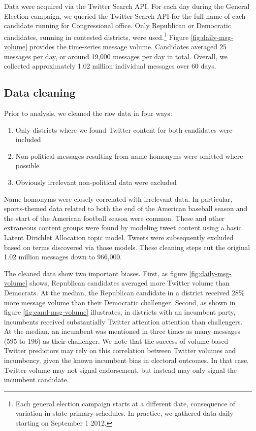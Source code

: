 \documentclass[11pt]{article}
\begin{document}
Data were acquired via the Twitter Search API. For each day during the
General Election campaign, we queried the Twitter Search API for the
full name of each candidate running for Congressional
office. Only Republican or Democratic candidates, running in contested
districts, were used.\footnote{Each general election campaign starts at a different
date, consequence of variation in state primary schedules. In
practice, we gathered data daily starting on September 1 2012.} Figure
\ref{fig:daily-msg-volume} provides the time-series message
volume. Candidates averaged 25 messages per day, or around 19,000
messages per day in total. Overall, we collected approximately 1.02
million individual messages over 60 days. 

\subsection{Data cleaning}
\label{sec:data-cleaning}

Prior to analysis, we cleaned the raw data in four ways:
\begin{enumerate}
\item Only districts where we found Twitter content for both
  candidates were included
\item Non-political messages resulting from name homonyms were omitted where possible
\item Obviously irrelevant non-political data were excluded
\end{enumerate}

Name homonyms were closely correlated with irrelevant data. In
particular, sports-themed data related to both the end of the American
baseball season and the start of the American football season were
common. These and other extraneous content groups were found by
modeling tweet content using a basic Latent Dirichlet Allocation topic
model. Tweets were subsequently excluded based on terms discovered via
those models. These cleaning steps cut the original 1.02 million
messages down to 966,000.

The cleaned data show two important biases. First, as figure
\ref{fig:daily-msg-volume} shows, Republican candidates averaged more
Twitter volume than Democrats. At the median, the Republican candidate
in a district received 28\% more message volume than their Democratic
challenger. Second, as shown in figure \ref{fig:cand-msg-volume}
illustrates, in districts with an incumbent party, incumbents received
substantially Twitter attention attention than challengers. At the
median, an incumbent was mentioned in three times as many messages
(595 to 196) as their challenger. We note that the success of
volume-based Twitter predictors may rely on this correlation between
Twitter volumes and incumbency, given the known incumbent bias in
electoral outcomes. In that case, Twitter volume may not signal
endorsement, but instead may only signal the incumbent candidate.
\end{document}
